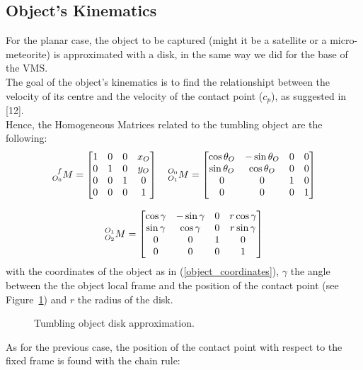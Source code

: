 \documentclass[a4paper,12pt,oneside]{report}
\begin{document}
\subsection{Object's Kinematics}
For the planar case, the object to be captured (might it be a satellite or a micro-meteorite) is approximated with a  disk, in the same way we did for the base of the VMS.\\
The goal of the object's kinematics is to find the relationshipt between the velocity of its centre and the velocity of the contact point ($c_p$), as suggested in [12].\\
Hence, the Homogeneous Matrices related to the tumbling object are the following:
\begin{equation}
  \begin{array}{c}
    \prescript{f}{O_0}{M}=\begin{bmatrix}
      1&0&0&x_O\\
    0&1&0&y_O\\
    0&0&1&0\\
    0&0&0&1
    \end{bmatrix}\quad
    \prescript{O_0}{O_1}{M}=\begin{bmatrix}
      \cos{\theta_O}&-\sin{\theta_O}&0&0\\
      \sin{\theta_O}&\cos{\theta_O}&0&0\\
      0&0&1&0\\
      0&0&0&1
    \end{bmatrix}\\
    \\
    \prescript{O_1}{O_2}{M}=\begin{bmatrix}
      \cos{\gamma}&-\sin{\gamma}&0&r \cos{\gamma}\\
      \sin{\gamma}&\cos{\gamma}&0&r \sin{\gamma}\\
      0&0&1&0\\
      0&0&0&1
    \end{bmatrix}
  \end{array}
\end{equation}
with the coordinates of the object as in (\ref{object_coordinates}), $\gamma$ the angle between the the object local frame and the position of the contact point (see Figure~\ref{contact_point}) and $r$ the radius of the disk.\\
\begin{figure}
  \centering
  
  \caption{Tumbling object disk approximation.}
  \label{contact_point}
\end{figure}
As for the previous case, the position of the contact point with respect to the fixed frame is found with the chain rule:
\end{document}
